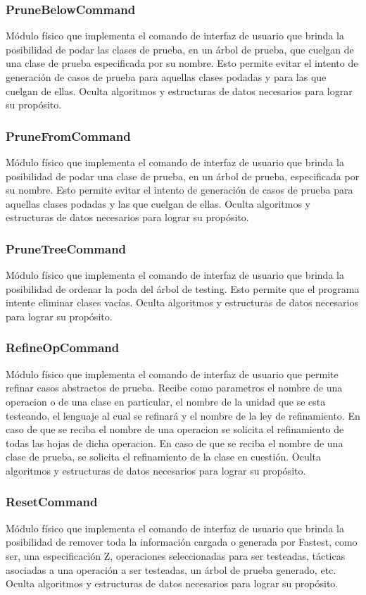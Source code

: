 \documentclass[a4paper,10pt]{report}
\begin{document}
			\subsubsection{PruneBelowCommand}
			Módulo físico que implementa el comando de interfaz de usuario que brinda la posibilidad de podar las clases de prueba, en un árbol de prueba, que cuelgan de una clase de prueba especificada por su nombre. Esto permite evitar el intento de generación de casos de prueba para aquellas clases podadas y para las que cuelgan de ellas. Oculta algoritmos y estructuras de datos necesarios para lograr su propósito.
			\subsubsection{PruneFromCommand}
			Módulo físico que implementa el comando de interfaz de usuario que brinda la posibilidad de podar una clase de prueba, en un árbol de prueba, especificada por su nombre. Esto permite evitar el intento de generación de casos de prueba para aquellas clases podadas y las que cuelgan de ellas. Oculta algoritmos y estructuras de datos necesarios para lograr su propósito.
			\subsubsection{PruneTreeCommand}
			Módulo físico que implementa el comando de interfaz de usuario que brinda la posibilidad de ordenar la poda del árbol de testing. Esto permite que el programa intente eliminar clases vacías. Oculta algoritmos y estructuras de datos necesarios para lograr su propósito.
			\subsubsection{RefineOpCommand}
			Módulo físico que implementa el comando de interfaz de usuario que permite refinar casos abstractos de prueba. Recibe como parametros el nombre de una operacion o de una clase en particular, el nombre de la unidad que se esta testeando, el lenguaje al cual se refinará y el nombre de la ley de refinamiento. En caso de que se reciba el nombre de una operacion se solicita el refinamiento de todas las hojas de dicha operacion. En caso de que se reciba el nombre de una clase de prueba, se solicita el refinamiento de la clase en cuestión. Oculta algoritmos y estructuras de datos necesarios para lograr su propósito.
			\subsubsection{ResetCommand}
			Módulo físico que implementa el comando de interfaz de usuario que brinda la posibilidad de remover toda la información cargada o generada por Fastest, como ser, una especificación Z, operaciones seleccionadas para ser testeadas, tácticas asociadas a una operación a ser testeadas, un árbol de prueba generado, etc. Oculta algoritmos y estructuras de datos necesarios para lograr su propósito.
\end{document}
